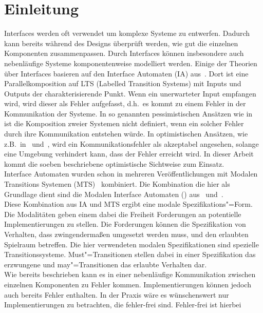 \chapter*{Einleitung}

Interfaces werden oft verwendet um komplexe Systeme zu entwerfen. Dadurch kann
bereits während des Designs überprüft werden, wie gut die einzelnen Komponenten
zusammenpassen. Durch Interfaces können insbesondere auch nebenläufige
Systeme komponentenweise modelliert werden. Einige der Theorien über Interfaces
basieren auf den Interface Automaten (IA) aus~\cite{Alfaro2004}. Dort ist eine
Parallelkomposition auf LTS (Labelled Transition Systems) mit Inputs und
Outputs der charakterisierende Punkt. Wenn ein unerwarteter Input empfangen
wird, wird dieser als Fehler aufgefasst, d.h.\ es kommt zu einem Fehler in der
Kommunikation der Systeme. In so genannten pessimistischen Ansätzen wie
in~\cite{Bauer2010} ist die Komposition zweier Systemen nicht
definiert, wenn ein solcher Fehler durch ihre Kommunikation entstehen würde. In
optimistischen Ansätzen, wie z.B.\ in~\cite{Luttgen2013MIA1}
und~\cite{Vogler2016MIA3}, wird ein Kommunikationsfehler als akzeptabel
angesehen, solange eine Umgebung verhindert kann, dass der Fehler
erreicht wird. In dieser Arbeit kommt die soeben beschriebene optimistische
Sichtweise zum Einsatz.\\
Interface Automaten wurden schon in mehreren Veröffentlichungen mit Modalen
Transitions Systemen (MTS)~\cite{Larsen1989} kombiniert. Die Kombination die
hier als Grundlage dient sind die Modalen Interface Automaten (\MIA{})
aus~\cite{Luttgen2013MIA1} und~\cite{Vogler2016MIA3}.\\
Diese Kombination aus IA und MTS ergibt eine modale Spezifikations"=Form. Die
Modalitäten geben einem dabei die Freiheit Forderungen an potentielle
Implementierungen zu stellen. Die Forderungen können die Spezifikation von
Verhalten, dass zwingendermaßen umgesetzt werden muss, und den erlaubten
Spielraum betreffen. Die hier verwendeten modalen Spezifikationen sind
spezielle Transitionssysteme. Must"=Transitionen stellen dabei in einer
Spezifikation das erzwungene und may"=Transitionen das erlaubte Verhalten
dar.\\
Wie bereits beschrieben kann es in einer nebenläufige Kommunikation zwischen
einzelnen Komponenten zu Fehler kommen. Implementierungen können jedoch auch
bereits Fehler enthalten. In der Praxis wäre es wünschenswert nur
Implementierungen zu betrachten, die fehler-frei sind. Fehler-frei ist hierbei
